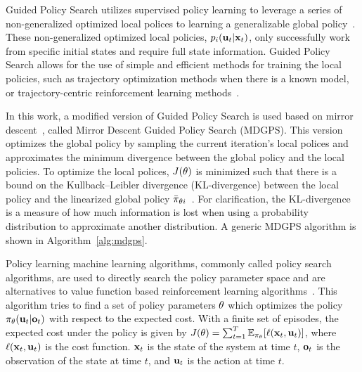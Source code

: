 Guided Policy Search utilizes supervised policy learning to leverage a series of non-generalized optimized local polices to learning a generalizable global policy~\cite{lk-gps-13}.
These non-generalized optimized local policies, $p_i(\mathbf{u}_t|\mathbf{x}_t)$, only successfully work from specific initial states and require full state information.
Guided Policy Search allows for the use of simple and efficient methods for training the local policies,
such as trajectory optimization methods when there is a known model, or
trajectory-centric reinforcement learning methods~\cite{la-lnnpg-14}.

In this work, a modified version of Guided Policy Search is used based on mirror descent~\cite{ml-gpsam-16}, called Mirror Descent Guided Policy Search (MDGPS).
This version optimizes the global policy by sampling the current iteration's local polices and approximates the minimum divergence between the global policy and the local policies.
To optimize the local polices, $J(\theta)$ is minimized such that there is a bound on the Kullback–Leibler divergence (KL-divergence) between the local policy and the linearized global policy $\bar{\pi}_{\theta{i}}$~\cite{bagnell2003covariant,ps-rlmsp-08,pma-reps-10,slmja-trpo-15}.
For clarification, the KL-divergence is a measure of how much information is lost when using a probability distribution to approximate another distribution.
A generic MDGPS algorithm is shown in Algorithm~\ref{alg:mdgps}.

Policy learning machine learning algorithms, commonly called policy search algorithms, are used to directly search the policy parameter space and are alternatives to value function based reinforcement learning algorithms~\cite{bagnell2003policy}. 
This algorithm tries to find a set of
policy parameters $\theta$ which optimizes the policy
$\pi_{\theta}(\mathbf{u}_t|\mathbf{o}_t)$ with respect to the expected cost. 
With a finite set of episodes, 
the expected cost under the policy is given by
$J(\theta)=\sum_{t=1}^{T}\mathbb{E}_{\pi_{\theta}}[\ell(\mathbf{x}_t,\mathbf{u}_t)]$,
where $\ell(\mathbf{x}_t,\mathbf{u}_t)$ is the cost function. 
$\mathbf{x}_t$ is the state of the
system at time $t$, $\mathbf{o}_t$ is the observation of the state at time $t$,
and $\mathbf{u}_t$ is the action at time $t$.


